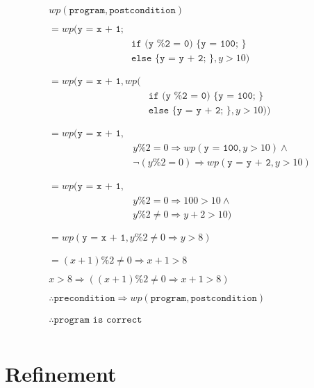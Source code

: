 \documentclass[landscape]{cheat}
\begin{document}
\begin{multicols*}{3}
\begin{gather}
\begin{split}
    wp(\texttt{program}, \texttt{postcondition})
\end{split}
\\
\begin{split}
    = wp(\texttt{y = x + 1;} \\
        &\texttt{if (y \% 2 = 0) \{ y = 100; \}} \\
        &\texttt{else \{ y = y + 2; \}}, y > 10) \\
\end{split}
\\
\begin{split}
    = wp(\texttt{y = x + 1}, wp( \\
        &\texttt{if (y \% 2 = 0) \{ y = 100; \}} \\
        &\texttt{else \{ y = y + 2; \}}, y > 10)) \\
\end{split}
\\
\begin{split}
    = wp(\texttt{y = x + 1}, \\
        &y \% 2 = 0 \Rightarrow wp(\texttt{y = 100}, y > 10) \land \\
        &\lnot(y \% 2 = 0) \Rightarrow wp(\texttt{y = y + 2}, y > 10) \\
\end{split}
\\
\begin{split}
    = wp(\texttt{y = x + 1}, \\
        &y \% 2 = 0 \Rightarrow 100 > 10 \land \\
        &y \% 2 \neq 0 \Rightarrow y + 2 > 10) \\
\end{split}
\\
\begin{split}
    = wp(\texttt{y = x + 1}, y \% 2 \neq 0 \Rightarrow y > 8) \\
\end{split}
\\
\begin{split}
    = (x + 1) \% 2 \neq 0 \Rightarrow x + 1 > 8
\end{split}
\\
\begin{split}
    x > 8 \Rightarrow ((x + 1) \% 2 \neq 0 \Rightarrow x + 1 > 8)
\end{split}
\\
\begin{split}
    \therefore \texttt{precondition} \Rightarrow wp(\texttt{program}, \texttt{postcondition}) \\
\end{split}
\\
\begin{split}
    \therefore \texttt{program is correct} \\
\end{split}
\end{gather}

\section{Refinement}

\end{multicols*}
\end{document}
